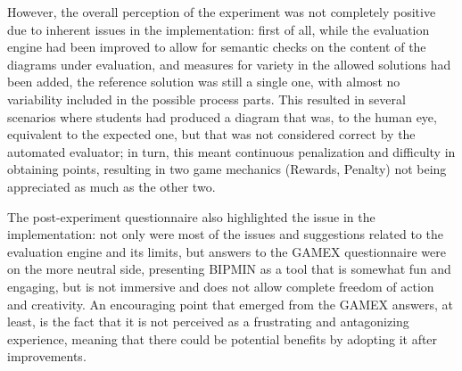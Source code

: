 However, the overall perception of the experiment was not completely positive due to inherent issues in the implementation: first of all, while the evaluation engine had been improved to allow for semantic checks on the content of the diagrams under evaluation, and measures for variety in the allowed solutions had been added, the reference solution was still a single one, with almost no variability included in the possible process parts. This resulted in several scenarios where students had produced a diagram that was, to the human eye, equivalent to the expected one, but that was not considered correct by the automated evaluator; in turn, this meant continuous penalization and difficulty in obtaining points, resulting in two game mechanics (Rewards, Penalty) not being appreciated as much as the other two.

The post-experiment questionnaire also highlighted the issue in the implementation: not only were most of the issues and suggestions related to the evaluation engine and its limits, but answers to the GAMEX questionnaire were on the more neutral side, presenting BIPMIN as a tool that is somewhat fun and engaging, but is not immersive and does not allow complete freedom of action and creativity. An encouraging point that emerged from the GAMEX answers, at least, is the fact that it is not perceived as a frustrating and antagonizing experience, meaning that there could be potential benefits by adopting it after improvements.

